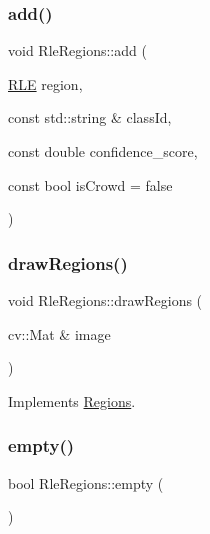 \mbox{\label{struct_rle_regions_a537a1a2b789d4d95fd579a82baf89f2f}} 
\subsubsection{\texorpdfstring{add()}{add()}\hspace{0.1cm}{\footnotesize\ttfamily [2/2]}}
{\footnotesize\ttfamily void Rle\+Regions\+::add (\begin{DoxyParamCaption}\item[{\hyperlink{struct_r_l_e}{R\+LE}}]{region,  }\item[{const std\+::string \&}]{class\+Id,  }\item[{const double}]{confidence\+\_\+score,  }\item[{const bool}]{is\+Crowd = {\ttfamily false} }\end{DoxyParamCaption})}

\mbox{\label{struct_rle_regions_aedcc9f614d38a2882a589e3014799d91}} 
\subsubsection{\texorpdfstring{draw\+Regions()}{drawRegions()}}
{\footnotesize\ttfamily void Rle\+Regions\+::draw\+Regions (\begin{DoxyParamCaption}\item[{cv\+::\+Mat \&}]{image }\end{DoxyParamCaption})\hspace{0.3cm}{\ttfamily [virtual]}}



Implements \hyperlink{struct_regions_adab32a2a00fc77abb6f4876939dc8505}{Regions}.

\mbox{\label{struct_rle_regions_acaea73c92cdcff78a60d1e10bed62c3d}} 
\subsubsection{\texorpdfstring{empty()}{empty()}}
{\footnotesize\ttfamily bool Rle\+Regions\+::empty (\begin{DoxyParamCaption}{ }\end{DoxyParamCaption})\hspace{0.3cm}{\ttfamily [virtual]}}



